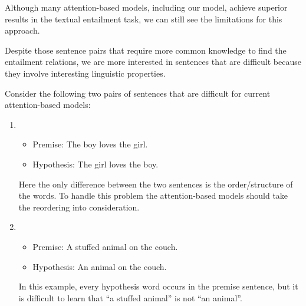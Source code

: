 
Although many attention-based
models, including our model, 
achieve superior 
results in the textual entailment task,
we can still see the limitations
for this approach.

Despite those sentence pairs that require
more common knowledge to find the entailment relations,
we are more interested in sentences that are difficult
because they involve interesting linguistic properties.

Consider the following two pairs of sentences
that are difficult for current attention-based models:
\begin{enumerate}
\item \begin{itemize}
\item Premise: The boy loves the girl.
\item Hypothesis: The girl loves the boy.
\end{itemize}
Here the only difference between the two sentences
is the order/structure of the words. To handle this problem
the attention-based models should take the reordering
into consideration.
\item 
\begin{itemize}
\item Premise: A stuffed animal on the couch.
\item Hypothesis: An animal on the couch.
\end{itemize}
In this example, every hypothesis word occurs in the premise sentence,
but it is difficult to learn that ``a stuffed animal'' 
is not ``an animal''.
\end{enumerate}

